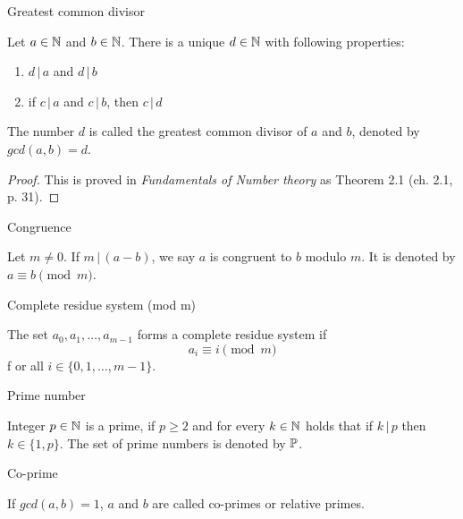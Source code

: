 \documentclass{article}
\begin{document}
\begin{theorem}
Greatest common divisor

Let $a \in \mathbb{N}$ and $b \in \mathbb{N}$. There is a unique $d \in \mathbb{N}$ with following properties:

\begin{enumerate}
 \item $d \,\vert\, a$ and $d \,\vert\, b$
 \item if $c \,\vert\, a$ and $c \,\vert\, b$, then $c \,\vert\, d$
\end{enumerate}

The number $d$ is called the greatest common divisor of $a$ and $b$, denoted by $gcd(a,b) = d$.

\begin{proof}
This is proved in \textit{Fundamentals of Number theory} \cite{LeVeque} as Theorem 2.1 (ch. 2.1, p. 31).
\end{proof}
\end{theorem}

\begin{definition}
Congruence

Let $m\not=0$. If $m\,\vert\,(a-b)$, we say $a$ is congruent to $b$ modulo $m$. It is denoted by $a\equiv b \pmod{m}$.
\end{definition}

\begin{definition}
Complete residue system (mod m)

The set $a_0,a_1,\dots,a_{m-1}$ forms a complete residue system if
\begin{equation*}
    a_i \equiv i \pmod{m}
\end{equation*}f
or all $i\in\{0,1,\dots,m-1\}$.
\end{definition}

\begin{definition}
Prime number

Integer $p\in\mathbb{N}$ is a prime, if $p \geq 2$ and for every $k\in\mathbb{N}$ holds that if $k \,\vert\, p$ then $k\in\{1, p\}$. The set of prime numbers is denoted by $\mathbb{P}$.


\end{definition}

\begin{definition}
Co-prime

If $gcd(a,b) = 1$, $a$ and $b$ are called co-primes or relative primes.
\end{definition}
\end{document}
